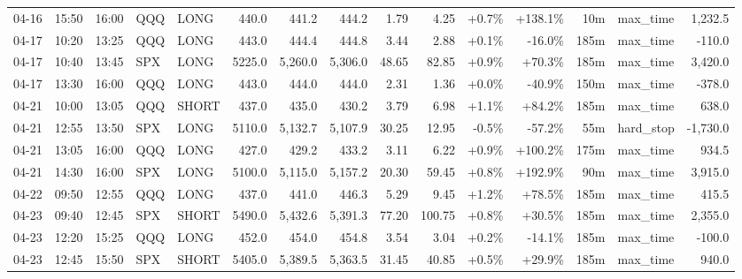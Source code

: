 \documentclass[11pt,a4paper,twoside]{article}
\begin{document}
\begin{landscape}
\begin{center}
\begin{longtable}{>{\color{txtmain}}l l l l l r r r r r r r r >{\color{txtmain}}l r}
04-16 & 15:50 & 16:00 & QQQ & LONG & 440.0 & 441.2 & 444.2 & 1.79 & 4.25 & \textcolor{wingreen}{+0.7\%} & \textcolor{wingreen}{+138.1\%} & 10m & max\_time & \textcolor{wingreen}{1,232.5} \\
04-17 & 10:20 & 13:25 & QQQ & LONG & 443.0 & 444.4 & 444.8 & 3.44 & 2.88 & \textcolor{wingreen}{+0.1\%} & \textcolor{lossred}{-16.0\%} & 185m & max\_time & \textcolor{lossred}{-110.0} \\
04-17 & 10:40 & 13:45 & SPX & LONG & 5225.0 & 5,260.0 & 5,306.0 & 48.65 & 82.85 & \textcolor{wingreen}{+0.9\%} & \textcolor{wingreen}{+70.3\%} & 185m & max\_time & \textcolor{wingreen}{3,420.0} \\
04-17 & 13:30 & 16:00 & QQQ & LONG & 443.0 & 444.0 & 444.0 & 2.31 & 1.36 & \textcolor{wingreen}{+0.0\%} & \textcolor{lossred}{-40.9\%} & 150m & max\_time & \textcolor{lossred}{-378.0} \\
04-21 & 10:00 & 13:05 & QQQ & SHORT & 437.0 & 435.0 & 430.2 & 3.79 & 6.98 & \textcolor{wingreen}{+1.1\%} & \textcolor{wingreen}{+84.2\%} & 185m & max\_time & \textcolor{wingreen}{638.0} \\
04-21 & 12:55 & 13:50 & SPX & LONG & 5110.0 & 5,132.7 & 5,107.9 & 30.25 & 12.95 & \textcolor{lossred}{-0.5\%} & \textcolor{lossred}{-57.2\%} & 55m & hard\_stop & \textcolor{lossred}{-1,730.0} \\
04-21 & 13:05 & 16:00 & QQQ & LONG & 427.0 & 429.2 & 433.2 & 3.11 & 6.22 & \textcolor{wingreen}{+0.9\%} & \textcolor{wingreen}{+100.2\%} & 175m & max\_time & \textcolor{wingreen}{934.5} \\
04-21 & 14:30 & 16:00 & SPX & LONG & 5100.0 & 5,115.0 & 5,157.2 & 20.30 & 59.45 & \textcolor{wingreen}{+0.8\%} & \textcolor{wingreen}{+192.9\%} & 90m & max\_time & \textcolor{wingreen}{3,915.0} \\
04-22 & 09:50 & 12:55 & QQQ & LONG & 437.0 & 441.0 & 446.3 & 5.29 & 9.45 & \textcolor{wingreen}{+1.2\%} & \textcolor{wingreen}{+78.5\%} & 185m & max\_time & \textcolor{wingreen}{415.5} \\
04-23 & 09:40 & 12:45 & SPX & SHORT & 5490.0 & 5,432.6 & 5,391.3 & 77.20 & 100.75 & \textcolor{wingreen}{+0.8\%} & \textcolor{wingreen}{+30.5\%} & 185m & max\_time & \textcolor{wingreen}{2,355.0} \\
04-23 & 12:20 & 15:25 & QQQ & LONG & 452.0 & 454.0 & 454.8 & 3.54 & 3.04 & \textcolor{wingreen}{+0.2\%} & \textcolor{lossred}{-14.1\%} & 185m & max\_time & \textcolor{lossred}{-100.0} \\
04-23 & 12:45 & 15:50 & SPX & SHORT & 5405.0 & 5,389.5 & 5,363.5 & 31.45 & 40.85 & \textcolor{wingreen}{+0.5\%} & \textcolor{wingreen}{+29.9\%} & 185m & max\_time & \textcolor{wingreen}{940.0} \\

\end{longtable}
\end{center}
\end{landscape}
\end{document}
